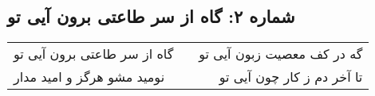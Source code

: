 \begin{center}
\section*{شماره ۲: گاه از سر طاعتی برون آیی تو}
\label{sec:002}
\begin{longtable}{l p{0.5cm} r}
گاه از سر طاعتی برون آیی تو
&&
گه در کف معصیت زبون آیی تو
\\
نومید مشو هرگز و امید مدار
&&
تا آخر دم ز کار چون آیی تو
\\
\end{longtable}
\end{center}

